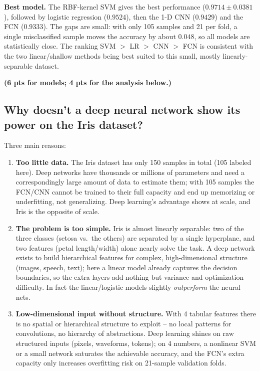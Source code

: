\documentclass[11pt,a4paper]{article}
\begin{document}
\textbf{Best model.} The RBF-kernel SVM gives the best performance
($0.9714\pm0.0381$), followed by logistic regression ($0.9524$), then the 1-D CNN
($0.9429$) and the FCN ($0.9333$). The gaps are small: with only 105 samples and 21
per fold, a single misclassified sample moves the accuracy by about $0.048$, so all
models are statistically close. The ranking SVM $>$ LR $>$ CNN $>$ FCN is consistent
with the two linear/shallow methods being best suited to this small, mostly
linearly-separable dataset.

\textbf{(6 pts for models; 4 pts for the analysis below.)}

\subsection{Why doesn't a deep neural network show its power on the Iris dataset?}
Three main reasons:

\begin{enumerate}[itemsep=2pt]
  \item \textbf{Too little data.} The Iris dataset has only 150 samples in total (105
  labeled here). Deep networks have thousands or millions of parameters and need a
  correspondingly large amount of data to estimate them; with 105 samples the FCN/CNN
  cannot be trained to their full capacity and end up memorizing or underfitting, not
  generalizing. Deep learning's advantage shows at scale, and Iris is the opposite of
  scale.
  \item \textbf{The problem is too simple.} Iris is almost linearly separable: two of
  the three classes (setosa vs.\ the others) are separated by a single hyperplane, and
  two features (petal length/width) alone nearly solve the task. A deep network exists
  to build hierarchical features for complex, high-dimensional structure (images,
  speech, text); here a linear model already captures the decision boundaries, so the
  extra layers add nothing but variance and optimization difficulty. In fact the
  linear/logistic models slightly \emph{outperform} the neural nets.
  \item \textbf{Low-dimensional input without structure.} With 4 tabular features
  there is no spatial or hierarchical structure to exploit -- no local patterns for
  convolutions, no hierarchy of abstractions. Deep learning shines on raw structured
  inputs (pixels, waveforms, tokens); on 4 numbers, a nonlinear SVM or a small
  network saturates the achievable accuracy, and the FCN's extra capacity only
  increases overfitting risk on 21-sample validation folds.
\end{enumerate}
\end{document}
